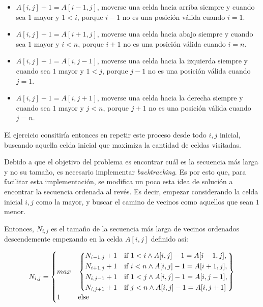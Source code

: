 \documentclass[letter]{article}
\begin{document}
\begin{itemize}
    \item $A[i, j] + 1 = A[i - 1, j]$, moverse una celda hacia arriba siempre y cuando sea $1$ mayor y $1 < i$, porque $i - 1$ no es una posición válida cuando $i = 1$.
    \item $A[i, j] + 1 = A[i + 1, j]$, moverse una celda hacia abajo siempre y cuando sea $1$ mayor y $i < n$, porque $i + 1$ no es una posición válida cuando $i = n$.
    \item $A[i, j] + 1 = A[i, j - 1]$, moverse una celda hacia la izquierda siempre y cuando sea $1$ mayor y $1 < j$, porque $j - 1$ no es una posición válida cuando $j = 1$.
    \item $A[i, j] + 1 = A[i, j + 1]$, moverse una celda hacia la derecha siempre y cuando sea $1$ mayor y $j < n$, porque $j + 1$ no es una posición válida cuando $j = n$.
\end{itemize}

El ejercicio consitiría entonces en repetir este proceso desde todo $i, j$ inicial, buscando aquella celda inicial que maximiza la cantidad de celdas visitadas. \par

Debido a que el objetivo del problema es encontrar cuál es la secuencia más larga y no su tamaño, es necesario implementar \textit{backtracking}. Es por esto que, para facilitar esta implementación, se modifica un poco esta idea de solución a encontrar la secuencia ordenada al revés. Es decir, empezar considerando la celda inicial $i, j$ como la mayor, y buscar el camino de vecinos como aquellos que sean $1$ menor. \par

\newpage

Entonces, $N_{i,j}$ es el tamaño de la secuencia más larga de vecinos ordenados descendemente empezando en la celda $A[i,j]$ definido así: \par

\[ N_{i,j} = 
    \begin{cases}
        max & 
        \begin{rcases}
            \begin{dcases}
                N_{i - 1, j} + 1 & \text{if } 1 < i \land A[i, j] - 1 = A[i - 1, j], \\
                N_{i + 1, j} + 1 & \text{if } i < n \land A[i, j] - 1 = A[i + 1, j], \\
                N_{i, j - 1} + 1 & \text{if } 1 < j \land A[i, j] - 1 = A[i, j - 1], \\
                N_{i, j + 1} + 1 & \text{if } j < n \land A[i, j] - 1 = A[i, j + 1] \\
            \end{dcases}
        \end{rcases} \\
        1 & \text{else}
    \end{cases} 
\]
\end{document}
